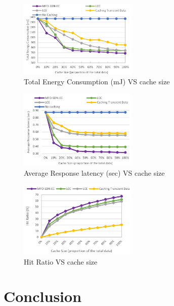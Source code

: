 \documentclass[conference]{IEEEtran}
\begin{document}
	\begin{figure}
		\centering
		\includegraphics[width=0.5\textwidth]{figures/energy-caching.png}
		\caption{Total Energy Consumption (mJ) VS cache size \cite{caching-1}}
		\label{fig:energy-caching}
	\end{figure}

	\begin{figure}
		\centering
		\includegraphics[width=0.5\textwidth]{figures/latency-caching.png}
		\caption{Average Response latency (sec) VS cache size \cite{caching-1}}
		\label{fig:latency-caching}
	\end{figure}

	\begin{figure}
		\centering
		\includegraphics[width=0.5\textwidth]{figures/hitrate-caching.png}
		\caption{Hit Ratio VS cache size \cite{caching-1}}
		\label{fig:latency-caching}
	\end{figure}

	\section{Conclusion}
	\label{sec:conclusion}
\end{document}
